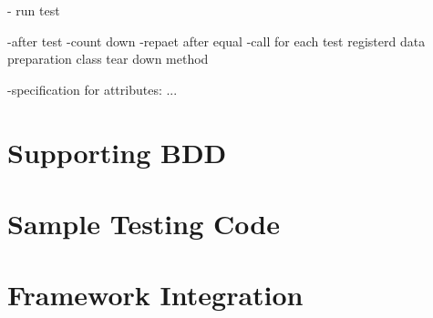     - run test
    
    -after test 
        -count down
        -repaet after equal
        -call for each test registerd data preparation class tear down method

-specification for attributes:
 ...

\section{Supporting BDD}


\todo{}


\section{Sample Testing Code}

\todo{}

\section{Framework Integration}
\todo{}